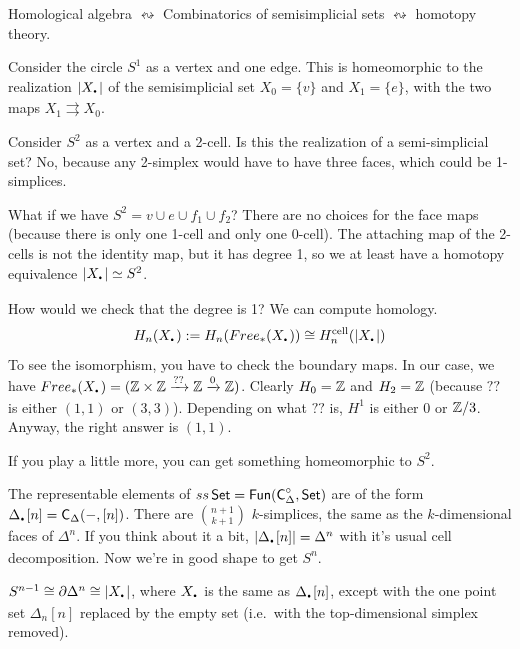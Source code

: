 
Homological algebra $\leftrightsquigarrow$ Combinatorics of semisimplicial sets $\leftrightsquigarrow$ homotopy theory.

\begin{example}
 Consider the circle $S^1$ as a vertex and one edge. This is homeomorphic to the realization $|X_\udot|$ of the semisimplicial set $X_0=\{v\}$ and $X_1=\{e\}$, with the two maps $X_1\rightrightarrows X_0$.
\end{example}
\begin{example}
 Consider $S^2$ as a vertex and a 2-cell. Is this the realization of a semi-simplicial set? No, because any 2-simplex would have to have three faces, which could be 1-simplices.
 
 What if we have $S^2=v\cup e\cup f_1\cup f_2$? There are no choices for the face maps (because there is only one 1-cell and only one 0-cell). The attaching map of the 2-cells is not the identity map, but it has degree 1, so we at least have a homotopy equivalence $|X_\udot|\simeq S^2$.
 
 How would we check that the degree is 1? We can compute homology.
 \[
  H_n(X_\udot):=H_n(Free_*(X_\udot))\cong H_n^{\text{cell}}(|X_\udot|)
 \]
 To see the isomorphism, you have to check the boundary maps. In our case, we have $Free_*(X_\udot)= (\ZZ\times \ZZ \xrightarrow{??} \ZZ \xrightarrow 0 \ZZ)$. Clearly $H_0=\mathbb{Z}$ and $H_2=\mathbb{Z}$ (because $??$ is either $(1,1)$ or $(3,3)$). Depending on what $??$ is, $H^1$ is either $0$ or $\mathbb{Z}/3$. Anyway, the right answer is $(1,1)$.
 
 If you play a little more, you can get something homeomorphic to $S^2$.
\end{example}
The representable elements of $ss\operatorname{\sf Set}=\text{\sf Fun}(\text{\sf C}_\Delta^\circ,\operatorname{\sf Set})$ are of the form $\Delta_\udot[n]=\C_\Delta(-,[n])$. There are $\binom{n+1}{k+1}$ $k$-simplices, the same as the $k$-dimensional faces of $\Delta^n$. If you think about it a bit, $|\Delta_\udot[n]|=\Delta^n$ with it's usual cell decomposition. Now we're in good shape to get $S^n$.

\begin{corollary}
 $S^{n-1}\cong \partial \Delta^n\cong |X_\udot|$, where $X_\udot$ is the same as $\Delta_\udot[n]$, except with the one point set $\Delta_n[n]$ replaced by the empty set (i.e.~with the top-dimensional simplex removed).
\end{corollary}

